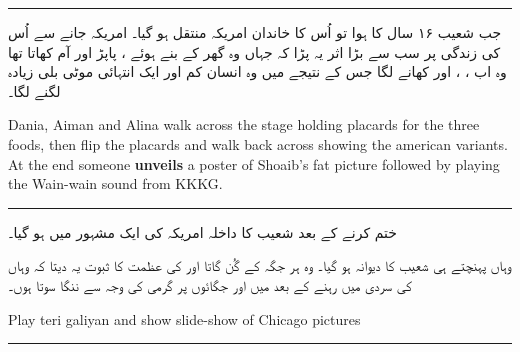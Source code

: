 \documentclass{article}
\begin{document}
\rule{\textwidth}{1pt}

جب شعیب ۱۶ سال کا ہوا تو اُس کا خاندان امریکہ منتقل ہو گیا۔ امریکہ جانے سے اُس کی زندگی پر سب سے بڑا اثر یہ پڑا کہ جہاں وہ گھر کے بنے ہوئے ، پاپڑ اور آم کھاتا تھا وہ اب ، ، اور  کھانے لگا جس کے نتیجے میں وہ انسان کم اور ایک انتہائی موٹی بلی زیادہ لگنے لگا۔  

\begin{enpara}
	Dania, Aiman and Alina walk across the stage holding placards for the three foods, then flip the placards and walk back across showing the american variants. At the end someone \textbf{unveils} a poster of Shoaib's fat picture followed by playing the Wain-wain sound from KKKG.
\end{enpara}

\rule{\textwidth}{1pt}

 ختم کرنے کے بعد شعیب کا داخلہ امریکہ کی ایک مشہور  میں ہو گیا۔ 

وہاں پہنچتے ہی شعیب  کا دیوانہ ہو گیا۔ وہ ہر جگہ  کے گُن گاتا اور  کی عظمت کا ثبوت یہ دیتا کہ وہاں کی سردی میں رہنے کے بعد میں اور جگائوں پر گرمی کی وجہ سے ننگا سوتا ہوں۔ 

\begin{enpara}
	Play teri galiyan and show slide-show of Chicago pictures
\end{enpara}

\rule{\textwidth}{1pt}
\end{document}
